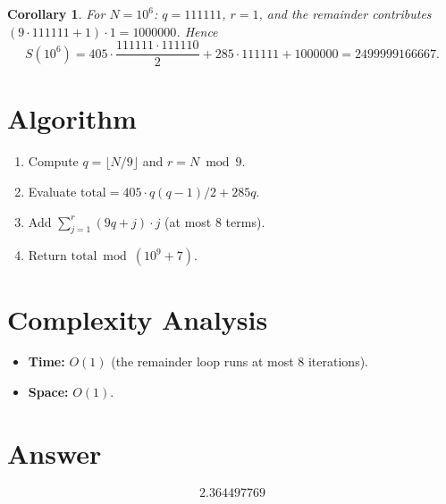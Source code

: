 \documentclass[11pt]{article}
\newtheorem{corollary}[theorem]{Corollary}
\begin{document}
\begin{corollary}
For $N = 10^6$: $q = 111111$, $r = 1$, and the remainder contributes $(9 \cdot 111111 + 1) \cdot 1 = 1000000$. Hence
\[
S(10^6) = 405 \cdot \frac{111111 \cdot 111110}{2} + 285 \cdot 111111 + 1000000 = 2499999166667.
\]
\end{corollary}

\section{Algorithm}

\begin{enumerate}
\item Compute $q = \lfloor N/9 \rfloor$ and $r = N \bmod 9$.
\item Evaluate $\text{total} = 405 \cdot q(q-1)/2 + 285q$.
\item Add $\sum_{j=1}^{r}(9q+j) \cdot j$ (at most 8 terms).
\item Return $\text{total} \bmod (10^9+7)$.
\end{enumerate}

\section{Complexity Analysis}

\begin{itemize}
\item \textbf{Time:} $O(1)$ (the remainder loop runs at most 8 iterations).
\item \textbf{Space:} $O(1)$.
\end{itemize}

\section{Answer}

\[
\boxed{2.364497769}
\]
\end{document}
